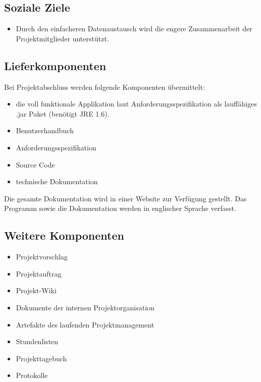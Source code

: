 \subsection{Soziale Ziele}
\begin{itemize}
\item Durch den einfacheren Datenaustausch wird die engere Zusammenarbeit der Projektmitglieder unterstützt.
\end{itemize}

\subsection{Lieferkomponenten}
Bei Projektabschluss werden folgende Komponenten übermittelt:
\begin{itemize}
\item die voll funktionale Applikation laut Anforderungsspezifikation als lauffähiges .jar Paket (benötigt JRE 1.6).
\item Benutzerhandbuch
\item Anforderungsspezifikation
\item Source Code
\item technische Dokumentation
\end{itemize}

Die gesamte Dokumentation wird in einer Website zur Verfügung gestellt. Das Programm sowie die Dokumentation werden in englischer Sprache verfasst.

\subsection{Weitere Komponenten}
\begin{itemize}
\item Projektvorschlag
\item Projektauftrag
\item Projekt-Wiki
\item Dokumente der internen Projektorganisation
\item Artefakte des laufenden Projektmanagement
\item Stundenlisten
\item Projekttagebuch
\item Protokolle
\end{itemize}
